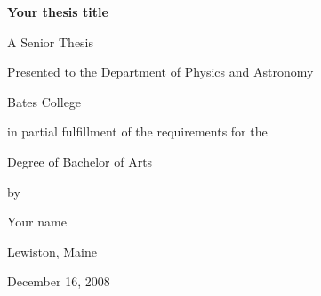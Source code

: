 \documentclass[../main]{subfiles}
\begin{document}


\vspace*{4cm} 

\centerline{\LARGE \textbf{Your thesis title}}
\bigskip\bigskip
\centerline{ A Senior Thesis}
\medskip
\centerline{ Presented to the Department of Physics and Astronomy}
\medskip
\centerline{Bates College}
\medskip
\centerline{in partial fulfillment of the requirements for the}
\medskip
\centerline{ Degree of Bachelor of Arts}
\medskip
\centerline{by}
\medskip
\centerline{\Large Your name}
\medskip
\centerline{ Lewiston, Maine}
\medskip
\centerline{ December 16, 2008}

\newpage
\end{document}
